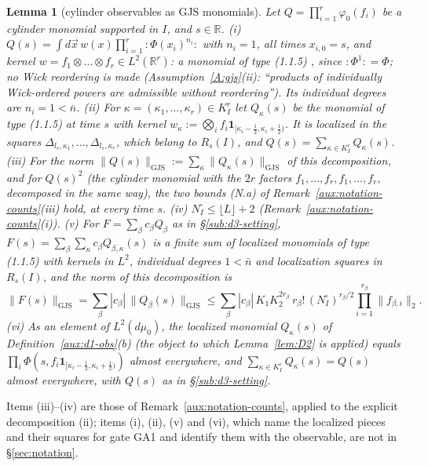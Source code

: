 \documentclass[11pt,a4paper]{article}
\theoremstyle{plain}
\theoremstyle{definition}
\theoremstyle{plain}
\newtheorem{auxlemma}{Lemma}
\theoremstyle{definition}
\newcommand{\R}{\mathbb{R}}
\newcommand{\GJS}[1]{\lVert #1\rVert_{\mathrm{GJS}}}   %
\newcommand{\dmu}{d\mu_0}
\begin{document}
\begin{auxlemma}[cylinder observables as GJS monomials]\label{aux:d3-cyl}
Let $Q=\prod_{i=1}^r\varphi_0(f_i)$ be a cylinder monomial supported in $I$, and $s\in\R$.
\emph{(i)} $Q(s)=\int d\vec x\,w(x)\prod_{i=1}^r{:}\Phi(x_i)^{n_i}{:}$ with $n_i=1$, all times
$x_{i,0}=s$, and kernel $w=f_1\otimes\dots\otimes f_r\in L^2(\R^r)$: a monomial of type (1.1.5)
\cite[p.~593]{GJS}, since ${:}\Phi^1{:}=\Phi$; no Wick reordering is made (Assumption~\ref{A:gjs}(ii): ``products of individually Wick-ordered powers are admissible without reordering'').
Its individual degrees are $n_i=1<\bar n$.
\emph{(ii)} For $\kappa=(\kappa_1,\dots,\kappa_r)\in K_I^r$ let $Q_\kappa(s)$ be the monomial of
type (1.1.5) at time $s$ with kernel
$w_\kappa:=\bigotimes_i f_i\mathbf 1_{[\kappa_i-\frac12,\kappa_i+\frac12)}$.  It is localized in
the squares $\Delta_{l_s,\kappa_1},\dots,\Delta_{l_s,\kappa_r}$, which belong to $R_s(I)$, and
$Q(s)=\sum_{\kappa\in K_I^r}Q_\kappa(s)$.
\emph{(iii)} For the norm $\GJS{Q(s)}:=\sum_\kappa\GJS{Q_\kappa(s)}$ of this decomposition, and for
$Q(s)^2$ (the cylinder monomial with the $2r$ factors $f_1,\dots,f_r,f_1,\dots,f_r$, decomposed
in the same way), the two bounds (N.a) of Remark~\ref{aux:notation-counts}(iii) hold, at every
time $s$.
\emph{(iv)} $N^\square_I\le\lfloor L\rfloor+2$ (Remark~\ref{aux:notation-counts}(i)).
\emph{(v)} For $F=\sum_\beta c_\beta Q_\beta$ as in \S\ref{sub:d3-setting},
$F(s)=\sum_\beta\sum_\kappa c_\beta Q_{\beta,\kappa}(s)$ is a finite sum of localized monomials
of type (1.1.5) with kernels in $L^2$, individual degrees $1<\bar n$ and localization squares in
$R_s(I)$, and the norm of this decomposition is
\[
 \GJS{F(s)}=\sum_\beta|c_\beta|\,\GJS{Q_\beta(s)}
 \le\sum_\beta|c_\beta|\,K_1K_2^{2r_\beta}\,r_\beta!\,(N^\square_I)^{r_\beta/2}
 \prod_{i=1}^{r_\beta}\|f_{\beta,i}\|_2 .
\]
\emph{(vi)} As an element of $L^2(\dmu)$, the localized monomial $Q_\kappa(s)$ of
Definition~\ref{aux:d1-obs}(b) (the object to which Lemma~\ref{lem:D2} is applied) equals
$\prod_i\Phi(s,f_i\mathbf 1_{[\kappa_i-\frac12,\kappa_i+\frac12)})$ almost everywhere, and
$\sum_{\kappa\in K_I^r}Q_\kappa(s)=Q(s)$ almost everywhere, with $Q(s)$ as in
\S\ref{sub:d3-setting}.
\end{auxlemma}

Items (iii)--(iv) are those of Remark~\ref{aux:notation-counts}, applied to the explicit
decomposition (ii); items (i), (ii), (v) and (vi), which name the localized pieces and their
squares for gate GA1 and identify them with the observable, are not in \S\ref{sec:notation}.
\end{document}
